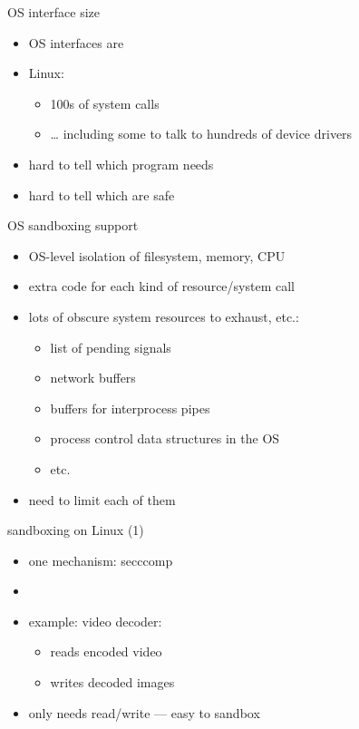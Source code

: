\begin{frame}{OS interface size}
    \begin{itemize}
    \item OS interfaces are 
    \item Linux:
        \begin{itemize}
        \item 100s of system calls
        \item \ldots{} including some to talk to hundreds of device drivers
        \end{itemize}
    \item hard to tell which program needs
    \item hard to tell which are safe
    \end{itemize}
\end{frame}

\begin{frame}{OS sandboxing support}
    \begin{itemize}
    \item OS-level isolation of filesystem, memory, CPU
    \item extra code for each kind of resource/system call
    \item lots of obscure system resources to exhaust, etc.:
        \begin{itemize}
        \item list of pending signals
        \item network buffers
        \item buffers for interprocess pipes
        \item process control data structures in the OS
        \item etc.
        \end{itemize}
    \item need to limit each of them
    \end{itemize}
\end{frame}

\begin{frame}{sandboxing on Linux (1)}
    \begin{itemize}
    \item one mechanism: secccomp
    \item {}
    \item example: video decoder:
        \begin{itemize}
        \item reads encoded video
        \item writes decoded images
        \end{itemize}
    \item only needs read/write --- easy to sandbox
    \end{itemize}
\end{frame}

